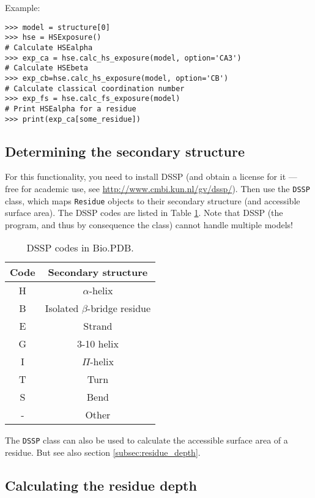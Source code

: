 Example:

\begin{verbatim}
>>> model = structure[0]
>>> hse = HSExposure()
# Calculate HSEalpha
>>> exp_ca = hse.calc_hs_exposure(model, option='CA3')
# Calculate HSEbeta
>>> exp_cb=hse.calc_hs_exposure(model, option='CB')
# Calculate classical coordination number
>>> exp_fs = hse.calc_fs_exposure(model)
# Print HSEalpha for a residue
>>> print(exp_ca[some_residue])
\end{verbatim}

\subsection{Determining the secondary structure}

For this functionality, you need to install DSSP (and obtain a license
for it --- free for academic use, see \url{http://www.cmbi.kun.nl/gv/dssp/}).
Then use the \texttt{DSSP} class, which maps \texttt{Residue} objects
to their secondary structure (and accessible surface area). The DSSP
codes are listed in Table \ref{cap:DSSP-codes}. Note that DSSP (the
program, and thus by consequence the class) cannot handle multiple
models!

\begin{table}
\begin{tabular}{|c|c|}
\hline
Code&
Secondary structure \\
\hline
\hline
H&
$\alpha$-helix \\
\hline
B&
Isolated $\beta$-bridge residue \\
\hline
E&
Strand \\
\hline
G&
3-10 helix \\
\hline
I&
$\Pi$-helix \\
\hline
T&
Turn\\
\hline
S&
Bend \\
\hline
-&
Other\\
\hline
\end{tabular}
\caption{\label{cap:DSSP-codes}DSSP codes in Bio.PDB.}
\end{table}

The \texttt{DSSP} class can also be used to calculate the accessible surface area of a residue. But see also section \ref{subsec:residue_depth}.

\subsection{Calculating the residue depth\label{subsec:residue_depth}}

